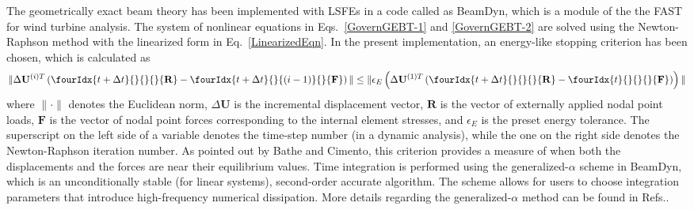 The geometrically exact beam theory has been implemented with LSFEs in a
code called  as BeamDyn, which is a module of the
the FAST for wind turbine analysis. The system of nonlinear
equations in Eqs.~\eqref{GovernGEBT-1} and \eqref{GovernGEBT-2} are solved
using the Newton-Raphson method with the linearized form in
Eq.~\eqref{LinearizedEqn}. 
In the present
implementation, an energy-like stopping criterion has been chosen, which is calculated as
\begin{equation}
    \label{StoppingCriterion}
    \| \Delta \mathbf{U}^{(i)T} \left( \fourIdx{t+\Delta t}{}{}{}{\mathbf{R}} -  \fourIdx{t+\Delta t}{}{(i-1)}{}{\mathbf{F}}  \right) \| \leq \| \epsilon_E \left( \Delta \mathbf{U}^{(1)T} \left( \fourIdx{t+\Delta t}{}{}{}{\mathbf{R}} - \fourIdx{t}{}{}{}{\mathbf{F}} \right) \right) \|
\end{equation}
where $\|\cdot\|$ denotes the Euclidean norm, $\Delta \mathbf{U}$ is the
incremental displacement vector, $\mathbf{R}$ is the vector of externally
applied nodal point loads, $\mathbf{F}$ is the vector of nodal point forces
corresponding to the internal element stresses, and $\epsilon_E$ is the
preset energy tolerance. The superscript on the left side of a variable
denotes the time-step number (in a dynamic analysis), while the one on the
right side denotes the Newton-Raphson iteration number. As pointed out by
Bathe and Cimento\cite{Bathe-Cimento:1980}, this criterion provides
a measure of when both the displacements and the forces are near their
equilibrium values. Time integration is performed using the
generalized-$\alpha$ scheme in BeamDyn, which is an unconditionally stable
(for linear systems),
second-order accurate algorithm.  The scheme allows for users to choose
integration parameters that introduce high-frequency numerical dissipation.
More details
regarding the generalized-$\alpha$ method can be found in
Refs.\cite{Chung-Hulbert:1993,Bauchau:2010}. 

